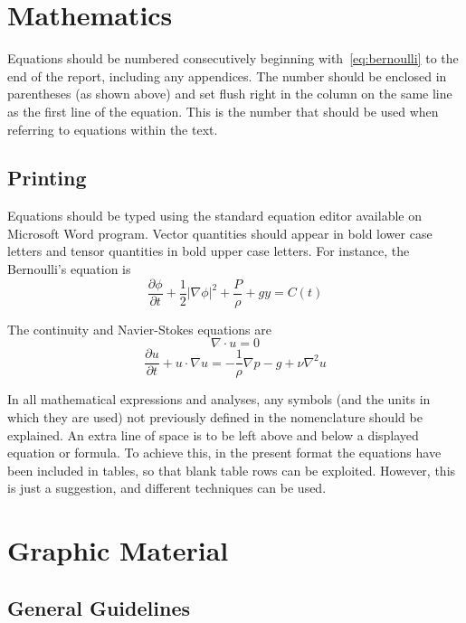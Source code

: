 \documentclass[bibtex,pagenumbers]{stabs2021}
\begin{document}
\section{Mathematics}

Equations should be numbered consecutively beginning with~\eqref{eq:bernoulli}
to the end of the report, including any appendices. The number should be
enclosed in parentheses (as shown above) and set flush right in the
column on the same line as the first line of the equation. This is the
number that should be used when referring to equations within the
text.

\subsection{Printing}

Equations should be typed using the standard equation editor
available on Microsoft Word program. Vector quantities should appear
in bold lower case letters and tensor quantities in bold upper case
letters. For instance, the Bernoulli’s equation is
\begin{equation}
  \label{eq:bernoulli}
  \frac{\partial\phi}{\partial t} + \frac12 |\nabla \phi|^2 + \frac P\rho + gy = C(t)
\end{equation}

The continuity and Navier-Stokes equations are
\begin{equation}
  \nabla\cdot u = 0
\end{equation}
\begin{equation}
  \frac{\partial u}{\partial t} + u\cdot \nabla u = -\frac1\rho \nabla p - g + \nu \nabla^2 u
\end{equation}

In all mathematical expressions and analyses, any symbols (and the
units in which they are used) not previously defined in the
nomenclature should be explained. An extra line of space is to be
left above and below a displayed equation or formula. To achieve this,
in the present format the equations have been included in tables, so
that blank table rows can be exploited. However, this is just a
suggestion, and different techniques can be used.

\section{Graphic Material}

\subsection{General Guidelines}
\end{document}
